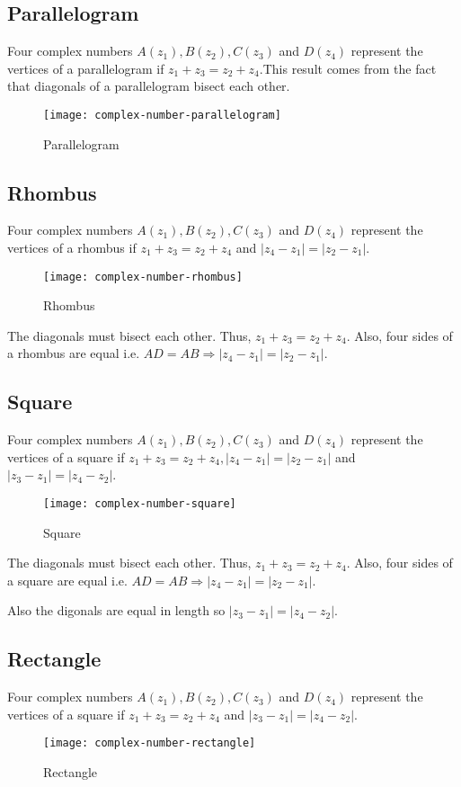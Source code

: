 \subsection{Parallelogram}
Four complex numbers $A(z_1), B(z_2), C(z_3)$ and $D(z_4)$ represent the vertices of a parallelogram if $z_1 + z_3 = z_2 +
z_4$.This result comes from the fact that diagonals of a parallelogram bisect each other.
\begin{figure}[h]
  \begin{center}
    \texttt{[image: complex-number-parallelogram]}
    \caption{Parallelogram}
  \end{center}
\end{figure}
\subsection{Rhombus}
Four complex numbers $A(z_1), B(z_2), C(z_3)$ and $D(z_4)$ represent the vertices of a rhombus if $z_1 + z_3 = z_2 + z_4$ and
$|z_4 - z_1| = |z_2 - z_1|$.
\begin{figure}[h]
  \begin{center}
    \texttt{[image: complex-number-rhombus]}
    \caption{Rhombus}
  \end{center}
\end{figure}
The diagonals must bisect each other. Thus, $z_1 + z_3 = z_2 + z_4.$ Also, four sides of a rhombus are equal i.e. $AD = AB
\Rightarrow |z_4 - z_1| = |z_2 - z_1|$.

\subsection{Square}
Four complex numbers $A(z_1), B(z_2), C(z_3)$ and $D(z_4)$ represent the vertices of a square if $z_1 + z_3 = z_2 + z_4,
|z_4 - z_1| = |z_2 - z_1|$ and $|z_3 - z_1| = |z_4 - z_2|$.
\begin{figure}[h]
  \begin{center}
    \texttt{[image: complex-number-square]}
    \caption{Square}
  \end{center}
\end{figure}

The diagonals must bisect each other. Thus, $z_1 + z_3 = z_2 + z_4.$ Also, four sides of a square are equal i.e. $AD = AB
\Rightarrow |z_4 - z_1| = |z_2 - z_1|$.

Also the digonals are equal in length so $|z_3 - z_1| = |z_4 - z_2|$.

\subsection{Rectangle}
Four complex numbers $A(z_1), B(z_2), C(z_3)$ and $D(z_4)$ represent the vertices of a square if $z_1 + z_3 = z_2 + z_4$ and $|z_3
- z_1| = |z_4 - z_2|$.
\begin{figure}[h]
  \begin{center}
    \texttt{[image: complex-number-rectangle]}
    \caption{Rectangle}
  \end{center}
\end{figure}

